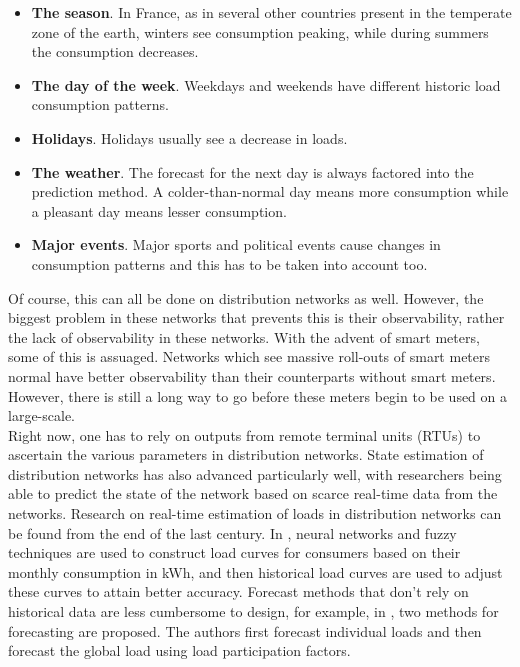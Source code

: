 \begin{itemize}
\item \textbf{The season}. In France, as in several other countries present in the temperate zone of the earth, winters see consumption peaking, while during summers the consumption decreases.\\
\item \textbf{The day of the week}. Weekdays and weekends have different historic load consumption patterns.\\
\item \textbf{Holidays}. Holidays usually see a decrease in loads.\\
\item \textbf{The weather}. The forecast for the next day is always factored into the prediction method. A colder-than-normal day means more consumption while a pleasant day means lesser consumption.\\
\item \textbf{Major events}. Major sports and political events cause changes in consumption patterns and this has to be taken into account too.
\end{itemize}

Of course, this can all be done on distribution networks as well. However, the biggest problem in these networks that prevents this is their observability, rather the lack of observability in these networks. With the advent of smart meters, some of this is assuaged. Networks which see massive roll-outs of smart meters normal have better observability than their counterparts without smart meters. However, there is still a long way to go before these meters begin to be used on a large-scale.\\

Right now, one has to rely on outputs from remote terminal units (RTUs) to ascertain the various parameters in distribution networks. State estimation of distribution networks has also advanced particularly well, with researchers being able to predict the state of the network based on scarce real-time data from the networks. Research on real-time estimation of loads in distribution networks can be found from the end of the last century. In \cite{Falcao2001}, neural networks and fuzzy techniques are used to construct load curves for consumers based on their monthly consumption in kWh, and then historical load curves are used to adjust these curves to attain better accuracy. Forecast methods that don't rely on historical data are less cumbersome to design, for example, in \cite{Nose2011}, two methods for forecasting are proposed. The authors first forecast individual loads and then forecast the global load using load participation factors.

